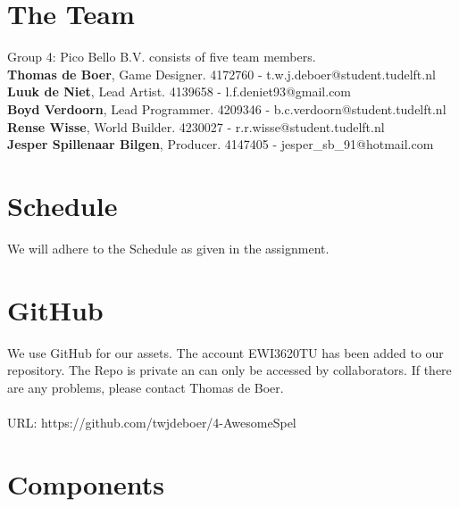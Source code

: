 \documentclass{article}
\begin{document}
	\section{The Team}
		Group 4: Pico Bello B.V. consists of five team members.\\
				\textbf{Thomas de Boer}, Game Designer. 4172760 - t.w.j.deboer@student.tudelft.nl\\
		\textbf{Luuk de Niet}, Lead Artist. 4139658 - l.f.deniet93@gmail.com\\
		\textbf{Boyd Verdoorn}, Lead Programmer. 4209346 - b.c.verdoorn@student.tudelft.nl\\
		\textbf{Rense Wisse}, World Builder. 4230027 - r.r.wisse@student.tudelft.nl\\
		\textbf{Jesper Spillenaar Bilgen}, Producer. 4147405 - jesper\_sb\_91@hotmail.com

	\section{Schedule}
		We will adhere to the Schedule as given in the assignment.

	\section{GitHub}
		We use GitHub for our assets. The account EWI3620TU has been added to our repository. The Repo is private an can only be accessed by collaborators. If there are any problems, please contact Thomas de Boer. \\
		\\
		URL: https://github.com/twjdeboer/4-AwesomeSpel

	\newpage
	\section{Components}
\end{document}
